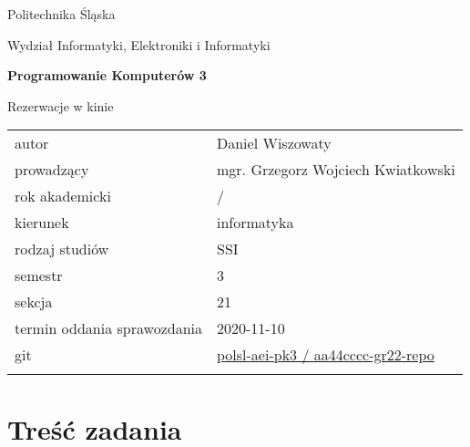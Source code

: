 \documentclass[12pt,a4paper,oneside]{article}
\let\oldmarginpar\marginpar
\renewcommand\marginpar[1]{%
  {\linespread{0.85}\normalfont\scriptsize%
\oldmarginpar[\hspace{1cm}\begin{minipage}{3cm}\raggedleft\scriptsize\color{black}\textsf{#1}\end{minipage}]%
{\hspace{0cm}\begin{minipage}{3cm}\raggedright\scriptsize\color{black}\textsf{#1}\end{minipage}}%
}%
}
\newcounter{rok}
\newcommand{\rokakademicki}{%
   \setcounter{rok}{\number\year}%
   \ifthenelse{\number\month<10}%
   {\addtocounter{rok}{-1}}%
   {}%
   \arabic{rok}/\addtocounter{rok}{1}\arabic{rok}
}
\begin{document}
\frenchspacing
\thispagestyle{empty}
\begin{center}
{\Large\sf Politechnika Śląska   %

Wydział Informatyki, Elektroniki i Informatyki

}

\vfill

 

\vfill\vfill

{\Huge\sffamily\bfseries Programowanie Komputerów 3\par}  

\vfill\vfill

{\LARGE\sf Rezerwacje w kinie}   


\vfill \vfill\vfill\vfill






\begin{tabular}{ll}
	\toprule
	autor                       & Daniel Wiszowaty    \\
	prowadzący                  & mgr. Grzegorz Wojciech Kwiatkowski  \\
	rok akademicki              & \rokakademicki         \\
	kierunek                    & informatyka            \\
	rodzaj studiów              & SSI                    \\
	semestr                     & 3                      \\
	sekcja                      & 21                     \\
	termin oddania sprawozdania & 2020-11-10             \\
	git & \href{https://github.com/polsl-aei-pk3/aa44cccc-gr22-repo}{polsl-aei-pk3 / aa44cccc-gr22-repo} \\
	\bottomrule
	                            &
\end{tabular}

\end{center}

\cleardoublepage

\section{Treść zadania}
\marginpar{}
\end{document}
